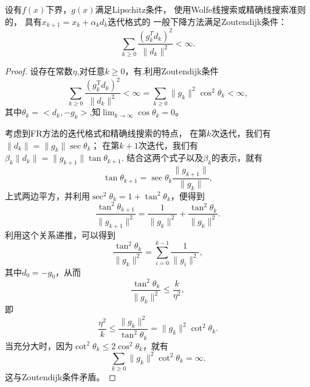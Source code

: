 \begin{theorem}[Zoutendijk条件]\cite{Book1}
    设有$f(x)$下界，$g(x)$满足Lipschitz条件，
    使用Wolfe线搜索或精确线搜索准则的，
    具有$x_{k+1}=x_{k}+\alpha_kd_k$迭代格式的
    一般下降方法满足Zoutendijk条件：
    \begin{equation*}
    \displaystyle\sum_{k\geq0}\frac{(g_k^Td_k)^2}{\|d_k\|^2}<\infty .
    \end{equation*}
\end{theorem}
\begin{proof}
    设存在常数$\eta$,对任意$k\geq0$，有.利用Zoutendijk条件
    \begin{equation}
        \displaystyle\sum_{k\geq0}\frac{(g_k^\mathrm {T}d_k)^2}{\|d_k\|^2}<\infty=
        \displaystyle\sum_{k\geq0}\|g_k\|^2\cos^2\theta_k < \infty,
        \nonumber
    \end{equation}
    其中$\theta_k = <d_k, -g_k>$,知$\displaystyle\lim_{k\to\infty}\cos\theta_k=0$。
    
    考虑到FR方法的迭代格式和精确线搜索的特点，
    在第$k$次迭代，我们有$\|d_k\|=\|g_k\|\sec\theta_k $；
    在第$k+1$次迭代，我们有$\beta_k\|d_k\| = \|g_{k+1}\|\tan\theta_{k+1}$.
    结合这两个式子以及$\beta_k$的表示，就有
    \begin{equation}
        \tan\theta_{k+1}=\sec\theta_k\displaystyle\frac{\|g_{k+1}\|}{\|g_k\|},
        \nonumber
    \end{equation}
    上式两边平方，并利用$\sec^2\theta_k=1+\tan^2\theta_k$，便得到
    \begin{equation}
        \displaystyle\frac{\tan^2\theta_{k+1}}{\|g_{k+1}\|^2} = 
        \displaystyle\frac{1}{\|g_k\|^2} + 
        \displaystyle\frac{\tan^2\theta_k}{\|g_k\|^2}.
        \nonumber
    \end{equation}
    利用这个关系递推，可以得到
    \begin{equation}
        \displaystyle\frac{\tan^2\theta_k}{\|g_k\|^2} = 
        \displaystyle\sum_{i=0}^{k-1}\frac{1}{\|g_i\|^2},
        \nonumber
    \end{equation}
    其中$d_0=-g_0$，从而
    \begin{equation}
        \displaystyle\frac{\tan^2\theta_k}{\|g_k\|^2} \leq
        \displaystyle\frac{k}{\eta^2},
        \nonumber
    \end{equation}
    即
    \begin{equation}
        \displaystyle\frac{\eta^2}{k} \leq
        \displaystyle\frac{\|g_k\|^2}{\tan^2\theta_k} =
        \|g_k\|^2\cot^2\theta_k.
        \nonumber
    \end{equation}
    当充分大时，因为$\cot^2\theta_k\leq2\cos^2\theta_k$，就有
    \begin{equation}
        \displaystyle\sum_{k\geq0}\|g_k\|^2\cot^2\theta_k = \infty.
        \nonumber
    \end{equation}
    这与Zoutendijk条件矛盾。
\end{proof}